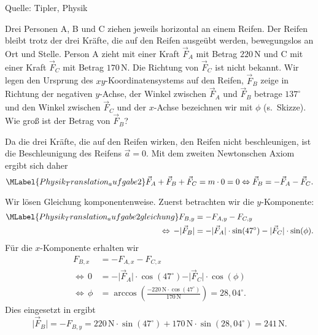 \begin{MExercises}
\begin{MExercise}
               Quelle: Tipler, Physik
               \end{MExercise}
               
               \begin{MExercise}
               Drei Personen A, B und C ziehen jeweils horizontal an einem Reifen. Der Reifen bleibt trotz der drei Kr\"afte, die auf den Reifen ausge\"ubt werden, bewegungslos an Ort und Stelle. Person A zieht mit einer Kraft $\vec{F}_A$ mit Betrag $220\,\text{N}$ und C mit einer Kraft $\vec{F}_C$ mit Betrag $170\,\text{N}$. Die Richtung von  $\vec{F}_C$ ist nicht bekannt. Wir legen den Ursprung des $xy$-Koordinatensystems auf den Reifen, $\vec{F}_B$ zeige in Richtung der negativen $y$-Achse, der Winkel zwischen $\vec{F}_A$ und $\vec{F}_B$ betrage $137^{\circ}$ und den Winkel zwischen $\vec{F}_C$ und der $x$-Achse bezeichnen wir mit $\phi$ (s.~Skizze). Wie gro{\ss} ist der Betrag von $\vec{F}_B$? 
               
               
               \begin{MSolution}
               Da die drei Kr\"afte, die auf den Reifen wirken, den Reifen nicht beschleunigen, ist die Beschleunigung des Reifens $\vec{a}=0$. Mit dem zweiten Newtonschen Axiom ergibt sich daher
               \begin{equation}\MLabel{Physik_Translation_aufgabe2}
               \vec{F}_A+\vec{F}_B+\vec{F}_C=m\cdot 0 =0 \Leftrightarrow \vec{F}_B=-\vec{F}_A-\vec{F}_C.
               \end{equation}
               
               Wir l\"osen Gleichung  komponentenweise. Zuerst betrachten wir die $y$-Komponente:
               \begin{eqnarray}\MLabel{Physik_Translation_aufgabe2gleichung}
               \nonumber F_{B,y}&=-F_{A,y}-F_{C,y}\\
               \Leftrightarrow\,-\vert \vec{F}_{B}\vert&= -\vert \vec{F}_{A}\vert\cdot\sin(47^{\circ})-\vert\vec{F}_{C}\vert\cdot\sin(\phi).
               \end{eqnarray} F\"ur die $x$-Komponente erhalten wir
               \begin{eqnarray*}
               F_{B,x}&=-F_{A,x}-F_{C,x}\\
               \Leftrightarrow\,0&=-\vert \vec{F}_{A}\vert\cdot\cos(47^{\circ})-\vert \vec{F}_{C}\vert\cdot\cos(\phi)\\
               \Leftrightarrow\,\phi&=\arccos \left(\frac{-220\, \text{N}\cdot\cos(47^{\circ})}{170\,\text{N}}\right)= {28,04}^{\circ}.
               \end{eqnarray*}Dies eingesetzt in  ergibt
               \begin{equation*}
               \vert \vec{F}_B\vert=-F_{B,y}=220\,\text{N}\cdot\sin(47^{\circ})+170 \,\text{N}\cdot\sin({28,04}^{\circ})=241\,\text{N}.
               \end{equation*}
               

\end{MSolution}
\end{MExercise}
\end{MExercises}
